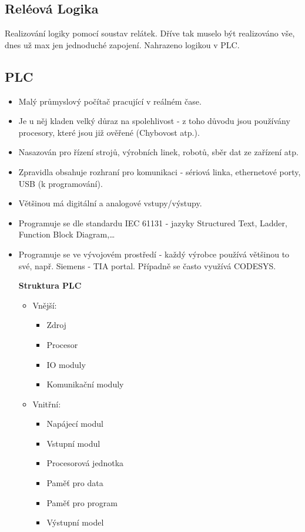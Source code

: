 \subsection{Reléová Logika}
Realizování logiky pomocí soustav relátek. Dříve tak muselo být realizováno vše, dnes už max jen jednoduché zapojení. Nahrazeno logikou v PLC.

\subsection{PLC}
\begin{itemize}
  \item Malý průmyslový počítač pracující v reálném čase.
  \item Je u něj kladen velký důraz na spolehlivost - z toho důvodu jsou používány procesory, které jsou již ověřené (Chybovost atp.). 
  \item Nasazován pro řízení strojů, výrobních linek, robotů, sběr dat ze zařízení atp.
  \item Zpravidla obsahuje rozhraní pro komunikaci - sériová linka, ethernetové porty, USB (k programování).
  \item Většinou má digitální a analogové vstupy/výstupy.
  \item Programuje se dle standardu IEC 61131 - jazyky Structured Text, Ladder, Function Block Diagram,\dots
  \item Programuje se ve vývojovém prostředí - každý výrobce používá většinou to své, např. Siemens - TIA portal. Případně se často využívá CODESYS.

\textbf{Struktura PLC}
\begin{itemize}
  \item Vnější: \begin{itemize}
    \item Zdroj
    \item Procesor 
    \item IO moduly 
    \item Komunikační moduly
  \end{itemize}
  \item Vnitřní: \begin{itemize}
    \item Napájecí modul
    \item Vstupní modul
    \item Procesorová jednotka
    \item Paměť pro data
    \item Paměť pro program
    \item Výstupní model
  \end{itemize}
\end{itemize}


\end{itemize}
